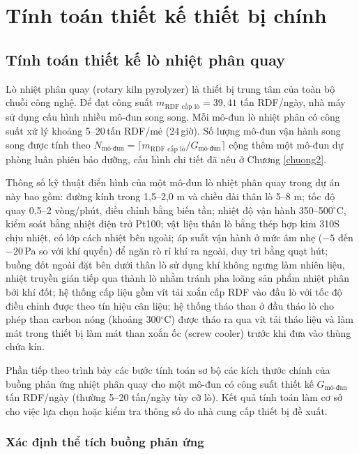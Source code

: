\documentclass[../main.tex]{subfiles}
\begin{document}
\section{Tính toán thiết kế thiết bị chính}
\subsection{Tính toán thiết kế lò nhiệt phân quay}
\label{sec:tinh-toan-lo-nhiet-phan-quay}

Lò nhiệt phân quay (rotary kiln pyrolyzer) là thiết bị trung tâm của toàn bộ chuỗi công nghệ. Để đạt công suất $m_{\text{RDF cấp lò}} = 39{,}41$ tấn RDF/ngày, nhà máy sử dụng cấu hình nhiều mô-đun song song. Mỗi mô-đun lò nhiệt phân có công suất xử lý khoảng 5--20\,tấn RDF/mẻ (24\,giờ). Số lượng mô-đun vận hành song song được tính theo $N_{\text{mô-đun}} = \lceil m_{\text{RDF cấp lò}} / G_{\text{mô-đun}} \rceil$ cộng thêm một mô-đun dự phòng luân phiên bảo dưỡng, cấu hình chi tiết đã nêu ở Chương \ref{chuong2}.

Thông số kỹ thuật điển hình của một mô-đun lò nhiệt phân quay trong dự án này bao gồm: đường kính trong 1,5--2,0 m và chiều dài thân lò 5--8 m; tốc độ quay 0,5--2 vòng/phút, điều chỉnh bằng biến tần; nhiệt độ vận hành 350--500$^\circ\mathrm{C}$, kiểm soát bằng nhiệt điện trở Pt100; vật liệu thân lò bằng thép hợp kim 310S chịu nhiệt, có lớp cách nhiệt bên ngoài; áp suất vận hành ở mức âm nhẹ ($-5$ đến $-20$\,Pa so với khí quyển) để ngăn rò rỉ khí ra ngoài, duy trì bằng quạt hút; buồng đốt ngoài đặt bên dưới thân lò sử dụng khí không ngưng làm nhiên liệu, nhiệt truyền gián tiếp qua thành lò nhằm tránh pha loãng sản phẩm nhiệt phân bởi khí đốt; hệ thống cấp liệu gồm vít tải xoắn cấp RDF vào đầu lò với tốc độ điều chỉnh được theo tín hiệu cân liệu; hệ thống tháo than ở đầu tháo lò cho phép than carbon nóng (khoảng 300$^\circ\mathrm{C}$) được tháo ra qua vít tải tháo liệu và làm mát trong thiết bị làm mát than xoắn ốc (screw cooler) trước khi đưa vào thùng chứa kín.

Phần tiếp theo trình bày các bước tính toán sơ bộ các kích thước chính của buồng phản ứng nhiệt phân quay cho một mô-đun có công suất thiết kế $G_{\text{mô-đun}}$ tấn RDF/ngày (thường 5--20 tấn/ngày tùy cỡ lò). Kết quả tính toán làm cơ sở cho việc lựa chọn hoặc kiểm tra thông số do nhà cung cấp thiết bị đề xuất.

\subsubsection{Xác định thể tích buồng phản ứng}
\end{document}
